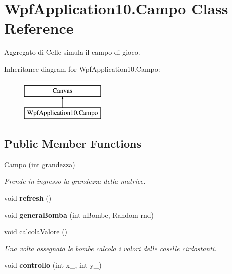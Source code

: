 \hypertarget{class_wpf_application10_1_1_campo}{}\section{Wpf\+Application10.\+Campo Class Reference}
\label{class_wpf_application10_1_1_campo}


Aggregato di Celle simula il campo di gioco.  


Inheritance diagram for Wpf\+Application10.\+Campo\+:\begin{figure}[H]
\begin{center}
\leavevmode
\includegraphics[height=2.000000cm]{class_wpf_application10_1_1_campo}
\end{center}
\end{figure}
\subsection*{Public Member Functions}
\begin{DoxyCompactItemize}
\item 
\mbox{\label{class_wpf_application10_1_1_campo_aef7860620b7283130d210748331a0a80}} 
\hyperlink{class_wpf_application10_1_1_campo_aef7860620b7283130d210748331a0a80}{Campo} (int grandezza)
\begin{DoxyCompactList}\small\item\em Prende in ingresso la grandezza della matrice. \end{DoxyCompactList}\item 
\mbox{\label{class_wpf_application10_1_1_campo_a626ff5f098dc2c30a4907664671c74ae}} 
void {\bfseries refresh} ()
\item 
\mbox{\label{class_wpf_application10_1_1_campo_ac5b29a3446d94cd6fd70229f126a63be}} 
void {\bfseries genera\+Bomba} (int n\+Bombe, Random rnd)
\item 
void \hyperlink{class_wpf_application10_1_1_campo_ab70e4d4a95b9d7660c361c8ab2b103fc}{calcola\+Valore} ()
\begin{DoxyCompactList}\small\item\em Una volta assegnata le bombe calcola i valori delle caselle cirdostanti. \end{DoxyCompactList}\item 
\mbox{\label{class_wpf_application10_1_1_campo_a1665e095674df35485694fd7aafd0475}} 
void {\bfseries controllo} (int x\+\_\+, int y\+\_\+)
\end{DoxyCompactItemize}
